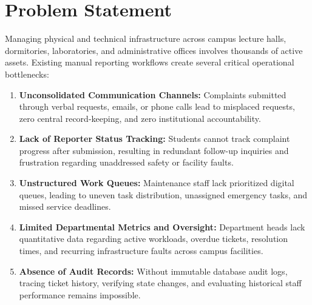 \documentclass[12pt, a4paper]{article}
\begin{document}
\newpage

\section{Problem Statement}

Managing physical and technical infrastructure across campus lecture halls, dormitories, laboratories, and administrative offices involves thousands of active assets. Existing manual reporting workflows create several critical operational bottlenecks:

\begin{enumerate}
    \item \textbf{Unconsolidated Communication Channels:} Complaints submitted through verbal requests, emails, or phone calls lead to misplaced requests, zero central record-keeping, and zero institutional accountability.
    
    \item \textbf{Lack of Reporter Status Tracking:} Students cannot track complaint progress after submission, resulting in redundant follow-up inquiries and frustration regarding unaddressed safety or facility faults.
    
    \item \textbf{Unstructured Work Queues:} Maintenance staff lack prioritized digital queues, leading to uneven task distribution, unassigned emergency tasks, and missed service deadlines.
    
    \item \textbf{Limited Departmental Metrics and Oversight:} Department heads lack quantitative data regarding active workloads, overdue tickets, resolution times, and recurring infrastructure faults across campus facilities.
    
    \item \textbf{Absence of Audit Records:} Without immutable database audit logs, tracing ticket history, verifying state changes, and evaluating historical staff performance remains impossible.
\end{enumerate}
\end{document}
